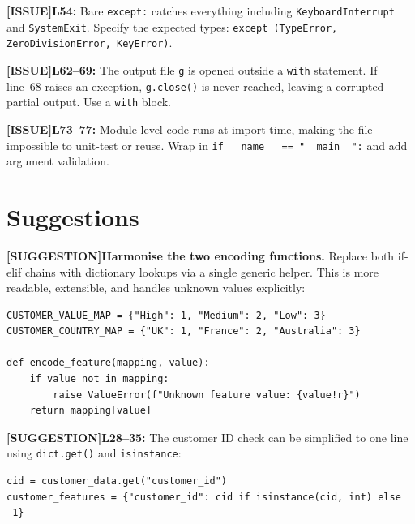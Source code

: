 \documentclass{article}
\newcommand{\lineno}[1]{\textbf{L#1:} }
\newcommand{\linesno}[2]{\textbf{L#1--#2:} }
\newcommand{\issue}{\textcolor{orange!80!black}{\textbf{[ISSUE]}}\space}
\newcommand{\suggestion}{\textcolor{suggblue}{\textbf{[SUGGESTION]}}\space}
\begin{document}
\begin{issuebox}
\issue \lineno{54} Bare \texttt{except:} catches everything including \texttt{KeyboardInterrupt} and \texttt{SystemExit}. Specify the expected types: \texttt{except (TypeError, ZeroDivisionError, KeyError)}.
\end{issuebox}

\begin{issuebox}
\issue \linesno{62}{69} The output file \texttt{g} is opened outside a \texttt{with} statement. If line~68 raises an exception, \texttt{g.close()} is never reached, leaving a corrupted partial output. Use a \texttt{with} block.
\end{issuebox}

\begin{issuebox}
\issue \linesno{73}{77} Module-level code runs at import time, making the file impossible to unit-test or reuse. Wrap in \texttt{if \_\_name\_\_ == "\_\_main\_\_":} and add argument validation.
\end{issuebox}

\section{Suggestions}

\begin{suggbox}
\suggestion \textbf{Harmonise the two encoding functions.} Replace both if-elif chains with dictionary lookups via a single generic helper. This is more readable, extensible, and handles unknown values explicitly:
\begin{lstlisting}[numbers=none]
CUSTOMER_VALUE_MAP = {"High": 1, "Medium": 2, "Low": 3}
CUSTOMER_COUNTRY_MAP = {"UK": 1, "France": 2, "Australia": 3}

def encode_feature(mapping, value):
    if value not in mapping:
        raise ValueError(f"Unknown feature value: {value!r}")
    return mapping[value]
\end{lstlisting}
\end{suggbox}

\begin{suggbox}
\suggestion \linesno{28}{35} The customer ID check can be simplified to one line using \texttt{dict.get()} and \texttt{isinstance}:
\begin{lstlisting}[numbers=none]
cid = customer_data.get("customer_id")
customer_features = {"customer_id": cid if isinstance(cid, int) else -1}
\end{lstlisting}
\end{suggbox}
\end{document}
